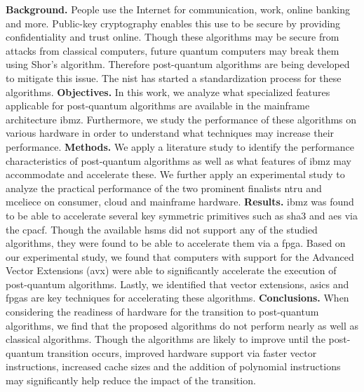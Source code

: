 \abstract
\noindent\textbf{Background.} People use the Internet for communication, work, online banking and more. Public-key cryptography enables this use to be secure by providing confidentiality and trust online. Though these algorithms may be secure from attacks from classical computers, future quantum computers may break them using Shor's algorithm. Therefore \gls{post-quantum} algorithms are being developed to mitigate this issue. The \acrlong{nist} has started a standardization process for these algorithms.\newline
\textbf{Objectives.} In this work, we analyze what specialized features applicable for \gls{post-quantum} algorithms are available in the mainframe architecture \gls{ibmz}. Furthermore, we study the performance of these algorithms on various hardware in order to understand what techniques may increase their performance.\newline
\textbf{Methods.} We apply a literature study to identify the performance characteristics of \gls{post-quantum} algorithms as well as what features of \gls{ibmz} may accommodate and accelerate these. We further apply an experimental study to analyze the practical performance of the two prominent finalists \gls{ntru} and \gls{mceliece} on consumer, cloud and mainframe hardware.\newline
\textbf{Results.} \gls{ibmz} was found to be able to accelerate several key symmetric primitives such as \gls{sha3} and \gls{aes} via the \gls{cpacf}. Though the available \acrlong{hsm}s did not support any of the studied algorithms, they were found to be able to accelerate them via a \gls{fpga}. Based on our experimental study, we found that computers with support for the Advanced Vector Extensions (\gls{avx}) were able to significantly accelerate the execution of \gls{post-quantum} algorithms. Lastly, we identified that vector extensions, \glspl{asic} and \glspl{fpga} are key techniques for accelerating these algorithms.\newline
\textbf{Conclusions.} When considering the readiness of hardware for the transition to \gls{post-quantum} algorithms, we find that the proposed algorithms do not perform nearly as well as classical algorithms. Though the algorithms are likely to improve until the \gls{post-quantum} transition occurs, improved hardware support via faster vector instructions, increased cache sizes and the addition of polynomial instructions may significantly help reduce the impact of the transition.


